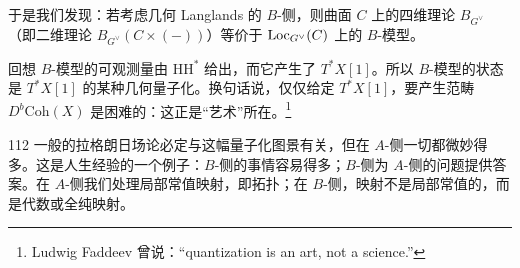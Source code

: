 于是我们发现：若考虑几何 Langlands 的 $B$-侧，则曲面 $C$ 上的四维理论 $B_{G^\vee}$（即二维理论 $B_{G^\vee}(C\times(-))$）等价于 $\mathrm{Loc}_{G^\vee}(C)$ 上的 $B$-模型。

回想 $B$-模型的可观测量由 $\mathrm{HH}^*$ 给出，而它产生了 $T^*X[1]$。所以 $B$-模型的状态是 $T^*X[1]$ 的某种几何量子化。换句话说，仅仅给定 $T^*X[1]$，要产生范畴 $D^b\mathrm{Coh}(X)$ 是困难的：这正是“艺术”所在。\footnote{Ludwig Faddeev 曾说：“quantization is an art, not a science.”}

\begin{srcrem}{112}
一般的拉格朗日场论必定与这幅量子化图景有关，但在 $A$-侧一切都微妙得多。这是人生经验的一个例子：$B$-侧的事情容易得多；$B$-侧为 $A$-侧的问题提供答案。在 $A$-侧我们处理局部常值映射，即拓扑；在 $B$-侧，映射不是局部常值的，而是代数或全纯映射。
\end{srcrem}
